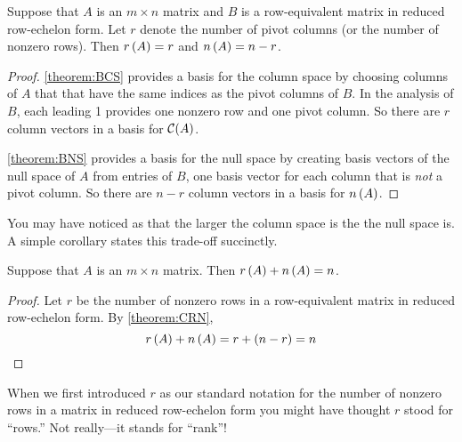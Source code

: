 \documentclass{ximera}
\begin{document}
\begin{theorem}
  \label{theorem:CRN}
  Suppose that $A$ is an $m\times n$ matrix and $B$ is a
  row-equivalent matrix in reduced row-echelon form.  Let $r$ denote
  the number of pivot columns (or the number of nonzero rows).  Then
  $r\left(A\right)=r$ and $n\left(A\right)=n-r$.

  \begin{proof}
    \ref{theorem:BCS} provides a basis for the column space by
    choosing columns of $A$ that that have the same indices as the
    pivot columns of $B$.  In the analysis of $B$, each leading 1
    provides one nonzero row and one pivot column.  So there are $r$
    column vectors in a basis for $\mathcal{C}\!\left(A\right)$.

    \ref{theorem:BNS} provides a basis for the null space by creating
    basis vectors of the null space of $A$ from entries of $B$, one
    basis vector for each column that is \textit{not} a pivot column.
    So there are $n-r$ column vectors in a basis for $n\left(A\right)$.
  \end{proof}
\end{theorem}

\begin{question}
  You may have noticed as that the larger the column space is the
   the null space
  is.  A simple corollary states this trade-off succinctly.
\end{question}

\begin{theorem}
  \label{theorem:RPNC}

  Suppose that $A$ is an $m\times n$ matrix.  Then
  $r\left(A\right)+n\left(A\right)=n$.

  \begin{proof}
    Let $r$ be the number of nonzero rows in a row-equivalent matrix
    in reduced row-echelon form.  By \ref{theorem:CRN},
    \[
      r\left(A\right)+n\left(A\right)= r+(n-r)=n
    \]
  \end{proof}
\end{theorem}

When we first introduced $r$ as our standard notation for the number
of nonzero rows in a matrix in reduced row-echelon form you might have
thought $r$ stood for ``rows.''  Not really---it stands for ``rank''!
\end{document}
